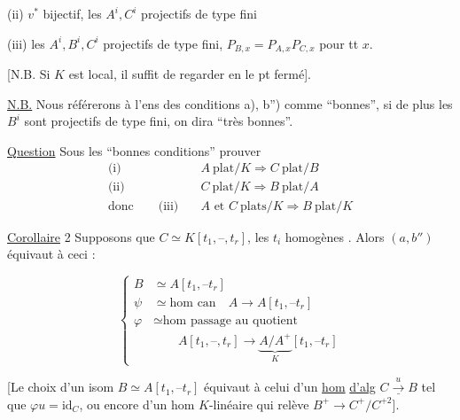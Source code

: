 (ii) $v^*$ bijectif, les $A^i,C^i$ projectifs de type fini

(iii) les $A^i,B^i,C^i$ projectifs de type fini,  $P_{B,x}=P_{A,x}P_{C,x}$ pour tt $x$.

[N.B. Si $K$ est local, il suffit de regarder en le pt fermé].

\uline{N.B.} Nous référerons à l'ens des conditions a), b'') comme ``bonnes'', si de plus les $B^i$ sont projectifs de type fini, on dira ``très bonnes''.

\uline{Question} Sous les ``bonnes conditions'' prouver
\[
\begin{aligned}
\text{(i)}\quad &A\ \text{plat}/K\Longrightarrow C\ \text{plat}/B\\
\text{(ii)}\quad &C\ \text{plat}/K\Longrightarrow B\ \text{plat}/A\\
\text{donc}\qquad\text{(iii)}\quad &A\text{ et }C\ \text{plats}/K\Longrightarrow B\ \text{plat}/K
\end{aligned}
\]

\uline{Corollaire} 2 Supposons que $C\simeq K[t_1,\text{--},t_r]$, les $t_i$ homogènes . Alors $(a,b'')$ équivaut à ceci :

\[
\left\{\begin{aligned}
 B&\simeq A[t_1,\text{--}t_r]\\
 \psi&\simeq\text{hom can}\quad A\longrightarrow A[t_1,\text{--}t_r]\\
 \varphi&\simeq\text{hom passage au quotient}\\
 &\qquad A[t_1,\text{--},t_r]\longrightarrow\underbrace{A/A^+}_{K}[t_1,\text{--}t_r]
\end{aligned}\right.
\]

[Le choix d'un isom $B\simeq A[t_1,\text{--}t_r]$ équivaut à celui d'un \uline{hom} \uline{d'alg}  $\underline{C\xrightarrow{u}B}$ tel que $\varphi u=\mathrm{id}_C$, ou encore d'un hom $K$-linéaire qui relève $B^+\longrightarrow C^+/C^{+2}$].


